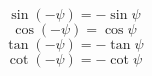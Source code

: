                     
                        $$ \sin\left(-\psi\right) = -\sin\psi $$
                        $$ \cos\left(-\psi\right) = \cos\psi $$                  
                        $$ \tan\left(-\psi\right) = -\tan\psi $$
                        $$ \cot\left(-\psi\right) = -\cot\psi $$       
                      

            
    
    
        




                            
